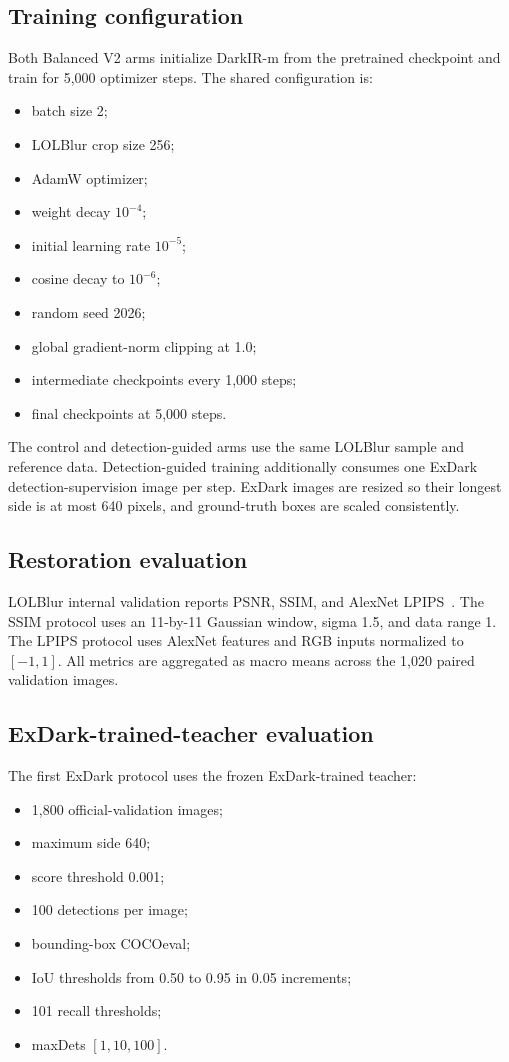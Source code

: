 \subsection{Training configuration}

Both Balanced V2 arms initialize DarkIR-m from the pretrained checkpoint
and train for 5,000 optimizer steps. The shared configuration is:
\begin{itemize}
  \item batch size 2;
  \item LOLBlur crop size 256;
  \item AdamW optimizer;
  \item weight decay \(10^{-4}\);
  \item initial learning rate \(10^{-5}\);
  \item cosine decay to \(10^{-6}\);
  \item random seed 2026;
  \item global gradient-norm clipping at 1.0;
  \item intermediate checkpoints every 1,000 steps;
  \item final checkpoints at 5,000 steps.
\end{itemize}

The control and detection-guided arms use the same LOLBlur sample and
reference data. Detection-guided training additionally consumes one ExDark
detection-supervision image per step. ExDark images are resized so their
longest side is at most 640 pixels, and ground-truth boxes are scaled
consistently.

\subsection{Restoration evaluation}

LOLBlur internal validation reports PSNR, SSIM, and AlexNet
LPIPS~\cite{zhang2018lpips}. The SSIM protocol uses an 11-by-11 Gaussian
window, sigma 1.5, and data range 1. The LPIPS protocol uses AlexNet
features and RGB inputs normalized to \([-1,1]\). All metrics are
aggregated as macro means across the 1,020 paired validation images.

\subsection{ExDark-trained-teacher evaluation}

The first ExDark protocol uses the frozen ExDark-trained teacher:
\begin{itemize}
  \item 1,800 official-validation images;
  \item maximum side 640;
  \item score threshold 0.001;
  \item 100 detections per image;
  \item bounding-box COCOeval;
  \item IoU thresholds from 0.50 to 0.95 in 0.05 increments;
  \item 101 recall thresholds;
  \item maxDets \([1,10,100]\).
\end{itemize}

